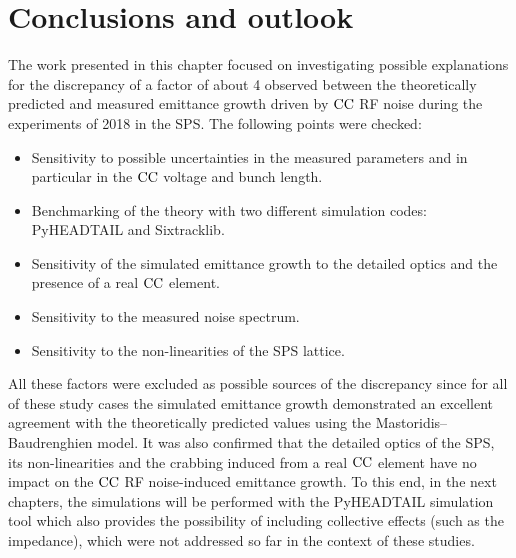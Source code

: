 \section{Conclusions and outlook}\label{sec:Ch6_conclusions}
The work presented in this chapter focused on investigating possible explanations for the discrepancy of a factor of about 4 observed between the theoretically predicted and measured emittance growth driven by ${\mathrm{CC}}$ RF noise during the experiments of 2018 in the SPS. The following points were checked:
\begin{itemize}
    \item Sensitivity to possible uncertainties in the measured parameters and in particular in the ${\mathrm{CC}}$ voltage and bunch length.
    \item Benchmarking of the theory with two different simulation codes: PyHEADTAIL and Sixtracklib.
    \item Sensitivity of the simulated emittance growth to the detailed optics and the presence of a real ${\mathrm{CC}}$ element.
    \item Sensitivity to the measured noise spectrum. 
    \item Sensitivity to the non-linearities of the SPS lattice.
\end{itemize}

All these factors were excluded as possible sources of the discrepancy since for all of these study cases the simulated emittance growth demonstrated an excellent agreement with the theoretically predicted values using the Mastoridis--Baudrenghien model. It was also confirmed that the detailed optics of the SPS, its non-linearities and the crabbing induced from a real ${\mathrm{CC}}$ element have no impact on the ${\mathrm{CC}}$ RF noise-induced emittance growth. To this end, in the next chapters, the simulations will be performed with the PyHEADTAIL simulation tool which also provides the possibility of including collective effects (such as the impedance), which were not addressed so far in the context of these studies.